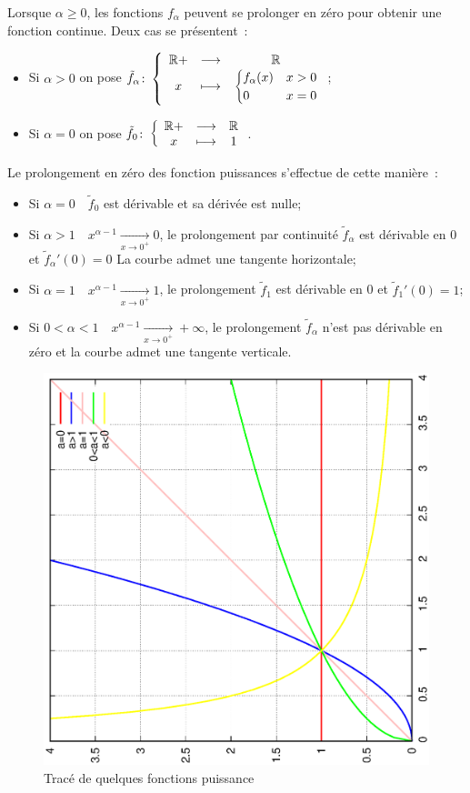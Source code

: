 Lorsque $\alpha \geq 0$, les fonctions $f_\alpha$ peuvent se prolonger en zéro pour obtenir une fonction continue. Deux cas se présentent~:
\begin{itemize}
\item Si $\alpha>0$ on pose $\tilde{f}_\alpha\colon \left\{\begin{array}{ccc} \mathbb{R}+ & \longrightarrow &\mathbb{R}\\ x & \longmapsto & \begin{cases} f_\alpha(x) & x>0 \\ 0 & x=0 \end{cases} \end{array} \right.$;
\item Si $\alpha=0$ on pose $\tilde{f}_0\colon \left\{\begin{array}{ccc} \mathbb{R}+ & \longrightarrow &\mathbb{R}\\ x & \longmapsto & 1 \end{array} \right.$.
\end{itemize}
Le prolongement en zéro des fonction puissances s'effectue de cette manière~:
\begin{itemize}
\item Si $\alpha=0 \quad \tilde{f}_0$ est dérivable et sa dérivée est nulle;
\item Si $\alpha>1 \quad x^{\alpha-1}\underset{x \to 0^+}{\longrightarrow}0$, le prolongement par continuité $\tilde{f}_\alpha$ est dérivable en 0 et $\tilde{f}_\alpha'(0)=0$ La courbe admet une tangente horizontale;
\item Si $\alpha=1 \quad x^{\alpha-1}\underset{x \to 0^+}{\longrightarrow}1$, le prolongement  $\tilde{f}_1$ est dérivable en 0 et $\tilde{f}_1'(0)=1$;
\item Si $0<\alpha<1 \quad x^{\alpha-1}\underset{x \to 0^+}{\longrightarrow}+\infty $, le prolongement $\tilde{f}_\alpha$ n'est pas dérivable en zéro et la courbe admet une tangente verticale.
\end{itemize}
%
\begin{figure}
  \centering
  \includegraphics[scale=0.4,angle=-90]{puiss.ps}
  \caption{Tracé de quelques fonctions puissance}
  \label{figtracepuissance}
\end{figure}

